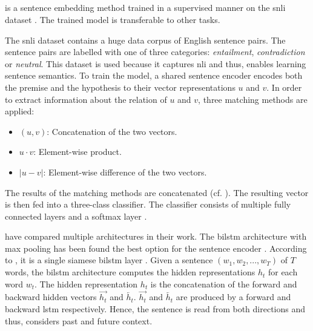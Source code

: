 \subsection{\infersent{}}\label{subsec:inferSent}

\infersent{} is a sentence embedding method trained in a supervised manner on the \ac{snli} dataset \cite{inferSent2018, HfsentTrans2019}.
The trained model is transferable to other tasks.

The \ac{snli} dataset contains a huge data corpus of English sentence pairs.
The sentence pairs are labelled with one of three categories: \textit{entailment}, \textit{contradiction} or \textit{neutral}.
This dataset is used because it captures \ac{nli} and thus, enables learning sentence semantics.
To train the model, a shared sentence encoder encodes both the premise and the hypothesis to their vector representations $u$ and $v$.
In order to extract information about the relation of $u$ and $v$, three matching methods are applied:

\begin{itemize}
    \item $(u,v)$: Concatenation of the two vectors.
    \item $u \cdot v$: Element-wise product.
    \item $|u - v|$: Element-wise difference of the two vectors.
\end{itemize}

The results of the matching methods are concatenated (cf. \cite{HfsentTrans2019}).
The resulting vector is then fed into a three-class classifier.
The classifier consists of multiple fully connected layers and a softmax layer \cite{inferSent2018}.

\citeauthor{inferSent2018} have compared multiple architectures in their work.
The \ac{bilstm} architecture with max pooling has been found the best option for the sentence encoder \cite{inferSent2018}.
According to \citeauthor{HfsentTrans2019}, it is a single siamese \ac{bilstm} layer \cite{HfsentTrans2019}.
Given a sentence $(w_1, w_2, ..., w_T)$ of $T$ words, the \ac{bilstm} architecture computes the hidden representations $h_t$ for each word $w_t$.
The hidden representation $h_t$ is the concatenation of the forward and backward hidden vectors $\overrightarrow{h_t}$ and $\overleftarrow{h_t}$.
$\overrightarrow{h_t}$ and $\overleftarrow{h_t}$ are produced by a forward and backward \ac{lstm} respectively.
Hence, the sentence is read from both directions and thus, considers past and future context.

